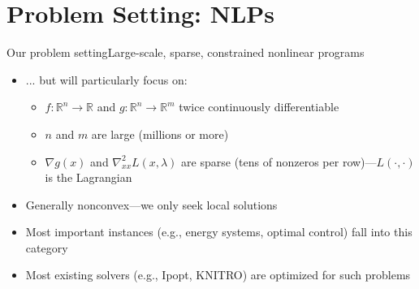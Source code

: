 \documentclass[aspectratio=169,11pt]{beamer}
\begin{document}
\section{Problem Setting: NLPs}
\begin{frame}{Our problem setting}{Large-scale, sparse, constrained nonlinear programs}
  \begin{itemize}
  \item {}
    ... but will particularly focus on:
    \begin{itemize}
    \item $f:\mathbb{R}^n\to\mathbb{R}$ and $g:\mathbb{R}^n\to\mathbb{R}^m$ twice continuously differentiable
    \item $n$ and $m$ are large (millions or more)
    \item $\nabla g(x)$ and $\nabla^2_{xx} L(x,\lambda)$ are \alert{sparse} (tens of nonzeros per row)---$L(\cdot,\cdot)$ is the Lagrangian
    \end{itemize}
  \item Generally \alert{nonconvex}---we only seek \alert{local solutions}
  \item Most important instances (e.g., energy systems, optimal control) fall into this category
  \item Most existing solvers (e.g., Ipopt, KNITRO) are optimized for such problems
  \end{itemize}
\end{frame}

\end{document}
